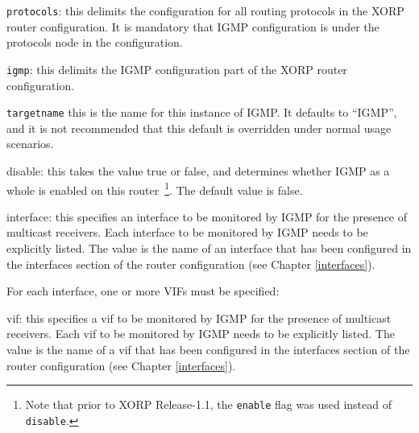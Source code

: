\begin{description}
\item{\tt protocols}: this delimits the configuration for all routing
  protocols in the XORP router configuration.  It is mandatory that
  IGMP configuration is under the {\stt protocols} node in the
  configuration.
\item{\tt igmp}: this delimits the IGMP configuration part of the XORP
  router configuration.
\item{\tt targetname} this is the name for this instance of IGMP.  It
  defaults to ``{\stt IGMP}'', and it is not recommended that this
  default is overridden under normal usage scenarios.
\item{\stt disable}: this takes the value {\stt true} or {\stt false},
  and determines whether IGMP as a whole is enabled on this
  router~\footnote{Note
  that prior to XORP Release-1.1, the {\tt enable} flag was used instead of
  {\tt disable}.}.
  The default value is {\stt false}.
\item{\stt interface}: this specifies an interface to be monitored by
  IGMP for the presence of multicast receivers.  Each interface to be
  monitored by IGMP needs to be explicitly listed. The value is the
  name of an interface that has been configured in the {\stt
  interfaces} section of the router configuration (see Chapter
  \ref{interfaces}).

  For each interface, one or more VIFs must be specified:
\begin{description}
\item{\stt vif}: this specifies a vif to be monitored by IGMP for the
  presence of multicast receivers.  Each vif to be monitored by IGMP
  needs to be explicitly listed.  The value is the name of a vif that
  has been configured in the {\stt interfaces} section of the router
  configuration (see Chapter \ref{interfaces}).
 

\end{description}
\end{description}
